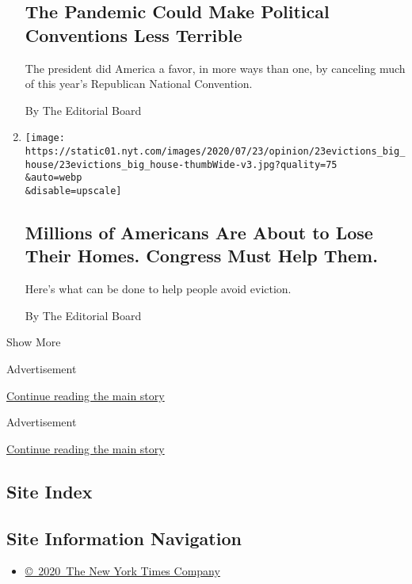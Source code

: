 \begin{enumerate}
{  \subsection{The Pandemic Could Make Political Conventions Less
  Terrible}\label{the-pandemic-could-make-political-conventions-less-terrible}}

  The president did America a favor, in more ways than one, by canceling
  much of this year's Republican National Convention.

  By The Editorial Board
\item
  \href{/2020/07/23/opinion/coronavirus-evictions-rent.html}{}

  \texttt{[image: https://static01.nyt.com/images/2020/07/23/opinion/23evictions\_big\_house/23evictions\_big\_house-thumbWide-v3.jpg?quality=75\\\&auto=webp\\\&disable=upscale]}

  \hypertarget{millions-of-americans-are-about-to-lose-their-homes-congress-must-help-them}{%
  \subsection{Millions of Americans Are About to Lose Their Homes.
  Congress Must Help
  Them.}\label{millions-of-americans-are-about-to-lose-their-homes-congress-must-help-them}}

  Here's what can be done to help people avoid eviction.

  By The Editorial Board
\end{enumerate}

Show More

Advertisement

\protect\hyperlink{after-mid1}{Continue reading the main story}

Advertisement

\protect\hyperlink{after-mktg}{Continue reading the main story}

\hypertarget{site-index}{%
\subsection{Site Index}\label{site-index}}

\hypertarget{site-information-navigation}{%
\subsection{Site Information
Navigation}\label{site-information-navigation}}

\begin{itemize}
\tightlist
\item
  \href{https://help.nytimes.com/hc/en-us/articles/115014792127-Copyright-notice}{©~2020~The
  New York Times Company}
\end{itemize}

